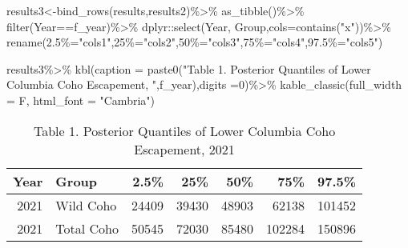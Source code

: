 \documentclass[
]{article}
\newenvironment{Shaded}{\begin{snugshade}}{\end{snugshade}}
\newcommand{\AttributeTok}[1]{\textcolor[rgb]{0.77,0.63,0.00}{#1}}
\newcommand{\DecValTok}[1]{\textcolor[rgb]{0.00,0.00,0.81}{#1}}
\newcommand{\FunctionTok}[1]{\textcolor[rgb]{0.00,0.00,0.00}{#1}}
\newcommand{\NormalTok}[1]{#1}
\newcommand{\OtherTok}[1]{\textcolor[rgb]{0.56,0.35,0.01}{#1}}
\newcommand{\SpecialCharTok}[1]{\textcolor[rgb]{0.00,0.00,0.00}{#1}}
\newcommand{\StringTok}[1]{\textcolor[rgb]{0.31,0.60,0.02}{#1}}
\begin{document}
\begin{Shaded}
\begin{Highlighting}[]
\NormalTok{results3}\OtherTok{\textless{}{-}}\FunctionTok{bind\_rows}\NormalTok{(results,results2)}\SpecialCharTok{\%\textgreater{}\%}
  \FunctionTok{as\_tibble}\NormalTok{()}\SpecialCharTok{\%\textgreater{}\%}
  \FunctionTok{filter}\NormalTok{(Year}\SpecialCharTok{==}\NormalTok{f\_year)}\SpecialCharTok{\%\textgreater{}\%}
\NormalTok{  dplyr}\SpecialCharTok{::}\FunctionTok{select}\NormalTok{(Year, Group,}\AttributeTok{cols=}\FunctionTok{contains}\NormalTok{(}\StringTok{"x"}\NormalTok{))}\SpecialCharTok{\%\textgreater{}\%}
  \FunctionTok{rename}\NormalTok{(}\StringTok{\textasciigrave{}}\AttributeTok{2.5\%}\StringTok{\textasciigrave{}}\OtherTok{=}\StringTok{"cols1"}\NormalTok{,}\StringTok{\textasciigrave{}}\AttributeTok{25\%}\StringTok{\textasciigrave{}}\OtherTok{=}\StringTok{"cols2"}\NormalTok{,}\StringTok{\textasciigrave{}}\AttributeTok{50\%}\StringTok{\textasciigrave{}}\OtherTok{=}\StringTok{"cols3"}\NormalTok{,}\StringTok{\textasciigrave{}}\AttributeTok{75\%}\StringTok{\textasciigrave{}}\OtherTok{=}\StringTok{"cols4"}\NormalTok{,}\StringTok{\textasciigrave{}}\AttributeTok{97.5\%}\StringTok{\textasciigrave{}}\OtherTok{=}\StringTok{"cols5"}\NormalTok{)}

\NormalTok{results3}\SpecialCharTok{\%\textgreater{}\%}
  \FunctionTok{kbl}\NormalTok{(}\AttributeTok{caption =} \FunctionTok{paste0}\NormalTok{(}\StringTok{"Table 1. Posterior Quantiles of Lower Columbia Coho Escapement, "}\NormalTok{,f\_year),}\AttributeTok{digits =}\DecValTok{0}\NormalTok{)}\SpecialCharTok{\%\textgreater{}\%}
  \FunctionTok{kable\_classic}\NormalTok{(}\AttributeTok{full\_width =}\NormalTok{ F, }\AttributeTok{html\_font =} \StringTok{"Cambria"}\NormalTok{)}
\end{Highlighting}
\end{Shaded}

\begin{table}

\caption{\label{tab:fitmodels}Table 1. Posterior Quantiles of Lower Columbia Coho Escapement, 2021}
\centering
\begin{tabular}[t]{r|l|r|r|r|r|r}
\hline
Year & Group & 2.5\% & 25\% & 50\% & 75\% & 97.5\%\\
\hline
2021 & Wild Coho & 24409 & 39430 & 48903 & 62138 & 101452\\
\hline
2021 & Total Coho & 50545 & 72030 & 85480 & 102284 & 150896\\
\hline
\end{tabular}
\end{table}
\end{document}
